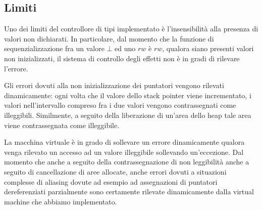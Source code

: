 \documentclass[../../main]{subfiles}
\begin{document}
\subsection{Limiti}

Uno dei limiti del controllore di tipi implementato è l'insensibilità alla presenza di valori non dichiarati. In particolare, dal momento che la funzione di sequenzializzazione fra un valore $\bot$ ed uno $rw$ è $rw$, qualora siano presenti valori non inizializzati, il sistema di controllo degli effetti non è in gradi di rilevare l'errore.

Gli errori dovuti alla non inizializzazione dei puntatori vengono rilevati dinamicamente: ogni volta che il valore dello stack pointer viene incrementato, i valori nell'intervallo compreso fra i due valori vengono contrassegnati come illeggibili. Similmente, a seguito della liberazione di un'area dello heap tale area viene contrassegnata come illeggibile.

La macchina virtuale è in grado di sollevare un errore dinamicamente qualora venga rilevato un accesso ad un valore illeggibile sollevando un'eccezione. Dal momento che anche a seguito della contrassegnazione di non leggibilità anche a seguito di cancellazione di aree allocate, anche errori dovuti a situazioni complesse di aliasing dovute ad esempio ad assegnazioni di puntatori dereferenziati parzialmente sono certamente rilevate dinamicamente dalla virtual machine che abbiamo implementato.

 
\end{document}
